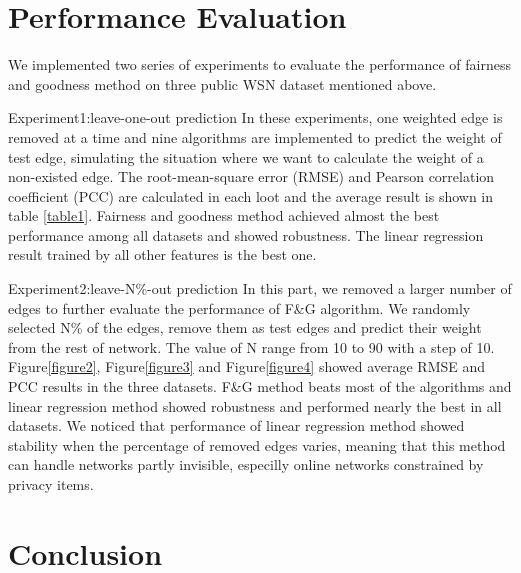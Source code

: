 \documentclass{article}
\begin{document}
\section{Performance Evaluation}

We implemented two series of experiments to evaluate the performance of fairness and goodness method on three public WSN dataset mentioned above. 

Experiment1:leave-one-out prediction
In these experiments, one weighted edge is removed at a time and nine algorithms are implemented to predict the weight of test edge, simulating the situation where we want to calculate the weight of a non-existed edge. The root-mean-square error (RMSE) and Pearson correlation coefficient (PCC) are calculated in each loot and the average result is shown in table \ref{table1}. Fairness and goodness method achieved almost the best performance among all datasets and showed robustness. The linear regression result trained by all other features is the best one. 

Experiment2:leave-N\%-out prediction
In this part, we removed a larger number of edges to further evaluate the performance of F\&G algorithm. We randomly selected N\% of the edges, remove them as test edges and predict their weight from the rest of network. The value of N range from 10 to 90 with a step of 10. Figure\ref{figure2}, Figure\ref{figure3} and Figure\ref{figure4} showed average RMSE and PCC results in the three datasets. F\&G method beats most of the algorithms and linear regression method showed robustness and performed nearly the best in all datasets. We noticed that performance of linear regression method showed stability when the percentage of removed edges varies, meaning that this method can handle networks partly invisible, especilly online networks constrained by privacy items. 




\section{Conclusion}




\end{document}
